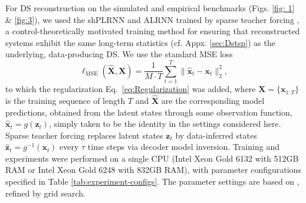 \documentclass{article}
\theoremstyle{example}
\theoremstyle{plain}
\theoremstyle{definition}
\theoremstyle{remark}
\def\eqref#1{equation~\ref{#1}}
\def\vx{{\bm{x}}}
\renewcommand{\eqref}[1]{Eq.~\ref{#1}}
\begin{document}
For DS reconstruction on the simulated and empirical benchmarks (Figs. \ref{fig: 1} \& \ref{fig:3}), we used the shPLRNN \citep{hess} and ALRNN \citep{brenner2024alrnn} trained by sparse teacher forcing \citep{mikhaeil2021difficulty}, a control-theoretically motivated training method for ensuring that reconstructed systems exhibit the same long-term statistics (cf. Appx. \ref{sec:Dstsp}) as the underlying, data-producing DS. We use the standard MSE loss 
\begin{equation}
    \ell_{\mathrm{MSE}}(\hat{\bm{X}}, \bm{X})
= \frac{1}{M \cdot T} \sum_{t=1}^{T} \lVert \hat{\bm{x}}_t - \bm{x}_t \rVert_2^{2},
\end{equation}
to which the regularization \eqref{eq:Regularization} was added, where $\bm{X}=\{\vx_{1:T}\}$ is the training sequence of length $T$ and $\hat{\bm{X}}$ are the corresponding model predictions, obtained from the latent states through some observation function, $\hat{\bm{x}}_t=g(\bm{z}_t)$, simply taken to be the identity in the settings considered here. Sparse teacher forcing replaces latent states $\bm{z}_t$ by data-inferred states $\hat{\bm{z}}_t=g^{-1}(\bm{x}_t)$ every $\tau$ time steps via decoder model inversion. 
\color{black}
Training and experiments were performed on a single CPU (Intel Xeon Gold 6132 with 512GB RAM or Intel Xeon Gold 6248 with 832GB RAM), with parameter configurations specified in Table \ref{tab:experiment-configs}. The parameter settings are based on \citep{brenner2024alrnn}, refined by grid search.
\end{document}

